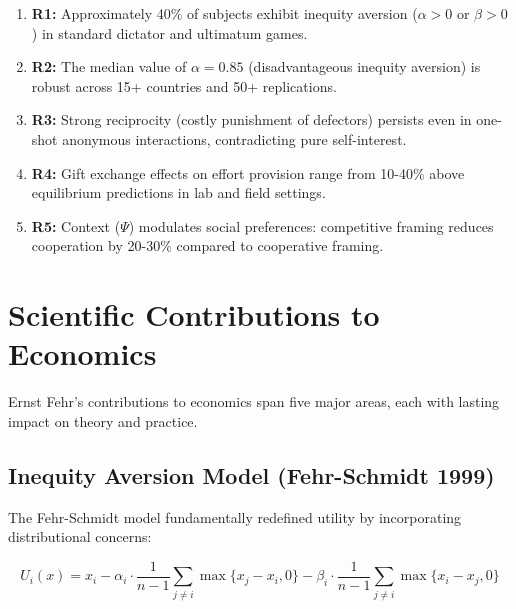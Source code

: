 \begin{enumerate}
    \item \textbf{R1:} Approximately 40\% of subjects exhibit inequity aversion
    ($\alpha > 0$ or $\beta > 0$) in standard dictator and ultimatum games.

    \item \textbf{R2:} The median value of $\alpha = 0.85$ (disadvantageous inequity
    aversion) is robust across 15+ countries and 50+ replications.

    \item \textbf{R3:} Strong reciprocity (costly punishment of defectors) persists
    even in one-shot anonymous interactions, contradicting pure self-interest.

    \item \textbf{R4:} Gift exchange effects on effort provision range from 10-40\%
    above equilibrium predictions in lab and field settings.

    \item \textbf{R5:} Context ($\Psi$) modulates social preferences: competitive
    framing reduces cooperation by 20-30\% compared to cooperative framing.
\end{enumerate}


\section{Scientific Contributions to Economics}
\label{sec:feh-economics}

Ernst Fehr's contributions to economics span five major areas, each with
lasting impact on theory and practice.

\subsection{Inequity Aversion Model (Fehr-Schmidt 1999)}
\label{sec:feh-inequity}

The Fehr-Schmidt model \citep{fehr1999theory} fundamentally redefined utility
by incorporating distributional concerns:

\begin{equation}
U_i(x) = x_i - \alpha_i \cdot \frac{1}{n-1} \sum_{j \neq i} \max\{x_j - x_i, 0\}
       - \beta_i \cdot \frac{1}{n-1} \sum_{j \neq i} \max\{x_i - x_j, 0\}
\label{eq:fehr-schmidt}
\end{equation}

